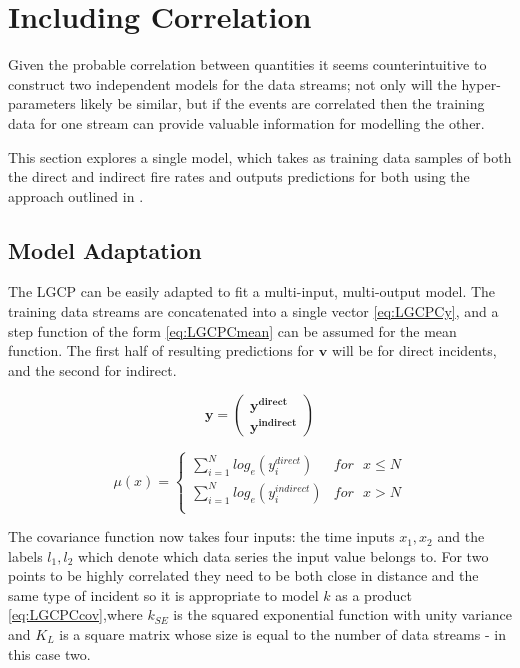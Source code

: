 \documentclass[a4paper,11pt]{report}
\begin{document}
\section{Including Correlation}


Given the probable correlation between quantities it seems counterintuitive to construct two independent models for the data streams; not only will the hyper-parameters likely be similar, but if the events are correlated then the training data for one stream can provide valuable information for modelling the other.\par

This section explores a single model, which takes as training data samples of both the direct and indirect fire rates and outputs predictions for both using the approach outlined in \cite{multi-outputGP}.

\subsection{Model Adaptation}

The LGCP can be easily adapted to fit a multi-input, multi-output model. The training data streams are concatenated into a single vector \ref{eq:LGCPCy}, and a step function of the form \ref{eq:LGCPCmean} can be assumed for the mean function. The first half of resulting predictions for \(\mathbf{v}\) will be for direct incidents, and the second for indirect.

\begin{equation} \label{eq:LGCPCy}
\mathbf{y} = \left( \begin{array}{cc}
\mathbf{y^{direct}} \\
\mathbf{y^{indirect}} \end{array} \right)
\end{equation}

\begin{equation} \label{eq:LGCPCmean}
\mu (x) = \begin{cases}  
\displaystyle \sum_{i=1}^{N} log_e(y_i^{direct}) & for \text{ }x\le N \\
\displaystyle \sum_{i=1}^{N}log_e(y_i^{indirect}) & for \text{ }x>N \\ \end{cases}
\end{equation}

The covariance function now takes four inputs: the time inputs \(x_1, x_2\) and the labels \(l_1,l_2\) which denote which data series the input value belongs to. For two points to be highly correlated they need to be both close in distance and the same type of incident so it is appropriate to model \(k\) as a product \ref{eq:LGCPCcov},where \(k_{SE}\) is the squared exponential function with unity variance and \(K_L\) is a square matrix whose size is equal to the number of data streams - in this case two. 
\end{document}
